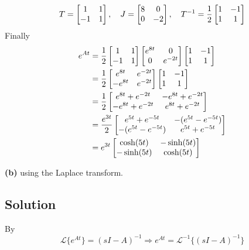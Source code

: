 \documentclass[12pt,a4paper]{article}
\begin{document}
\[
T = \begin{bmatrix}
	1 & 1 \\ -1 & 1	
\end{bmatrix},\quad J = \begin{bmatrix}
8 & 0 \\ 0 & -2
\end{bmatrix}, \quad T^{-1} = {1\over2}\begin{bmatrix}
1 & -1 \\ 1 & 1
\end{bmatrix}
\]
Finally
\begin{align*}
	e^{At} &= {1\over2} \begin{bmatrix}
		1 & 1 \\ -1 & 1	
	\end{bmatrix}\begin{bmatrix}
	e^{8t} & 0 \\ 0 & e^{-2t}
	\end{bmatrix}\begin{bmatrix}
	1 & -1 \\ 1 & 1
	\end{bmatrix} \\
	&= {1\over2}\begin{bmatrix}
		e^{8t} & e^{-2t} \\
		-e^{8t} & e^{-2t}
	\end{bmatrix}\begin{bmatrix}
	1 & -1 \\ 1 & 1
	\end{bmatrix}\\
	&= {1\over2 } \begin{bmatrix}
		e^{8t} + e^{-2t} & -e^{8t} + e^{-2t} \\
		-e^{8t} + e^{-2t} & e^{8t} + e^{-2t}
	\end{bmatrix} \\
    &= {e^{3t}\over 2} \begin{bmatrix}
        e^{5t} + e^{-5t} & -(e^{5t} - e^{-5t}) \\
        -(e^{5t} - e^{-5t}) & e^{5t} + e^{-5t}
    \end{bmatrix} \\
    &= e^{3t} \begin{bmatrix}
        \cosh(5t) & -\sinh(5t) \\
        -\sinh(5t) & \cosh(5t)
    \end{bmatrix}
\end{align*}

\textbf{(b)} using the Laplace transform.
\subsection*{Solution}
By
\[
\mathcal L \{e^{At}\} = (sI -A)^{-1} \Rightarrow e^{At} = \mathcal{L}^{-1} \{ (sI - A)^{-1} \}
\]
\end{document}
